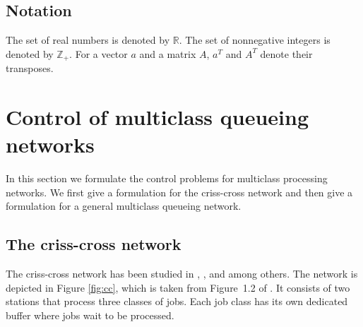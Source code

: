 \documentclass[11pt]{article}
\newcommand{\delete}[1]{\textcolor{red}{\sout{#1}}}
\newcommand{\R}{\mathbb{R}}
\newcommand{\Z}{\mathbb{Z}}
\theoremstyle{definition}
\numberwithin{equation}{section}
\begin{document}










   \subsection{Notation}
   The set of real numbers is denoted by $\R$. The set of nonnegative
   integers is denoted by $\Z_+$. For a vector $a$ and a matrix $A$,
   $a^T$ and $A^T$ denote their transposes.

\section{Control of multiclass queueing networks}\label{sec:MQN}

In this section we formulate the   control problems
for multiclass processing networks. We first give a   formulation for the criss-cross network and then give a
formulation for a general multiclass queueing network.



\subsection{The criss-cross network}
The criss-cross network has been studied in
\cite{Harrison1990},  \cite{Avram1995}, and
  \cite{Martins1996} among others. The network is depicted in Figure
  \ref{fig:cc}, which is taken from Figure~1.2 of \cite{DaiHarr2020}.
  It consists of two stations that process three classes
of jobs. Each job class has its own dedicated buffer where jobs wait
to be processed.
\end{document}
